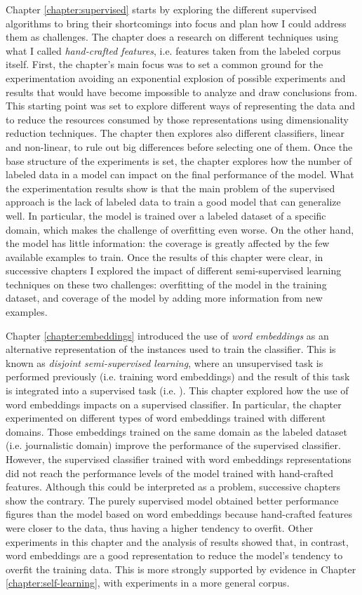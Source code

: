 Chapter \ref{chapter:supervised} starts by exploring the different supervised
algorithms to bring their shortcomings into focus and plan how I could address
them as challenges. The chapter does a research on different techniques using
what I called {\em hand-crafted features}, i.e. features taken from the labeled
corpus itself. First, the chapter's main focus was to set a common ground for
the experimentation avoiding an exponential explosion of possible experiments
and results that would have become impossible to analyze and draw conclusions
from.  This starting point was set to explore different ways of representing
the data and to reduce the resources consumed by those representations using
dimensionality reduction techniques. The chapter then explores also different
classifiers, linear and non-linear, to rule out big differences before
selecting one of them. Once the base structure of the experiments is set, the
chapter explores how the number of labeled data in a model can impact on the
final performance of the model. What the experimentation results show is that
the main problem of the supervised approach is the lack of labeled data to
train a good model that can generalize well. In particular, the model is
trained over a labeled dataset of a specific domain, which makes the challenge
of overfitting even worse. On the other hand, the model has little information:
the coverage is greatly affected by the few available examples to train. Once
the results of this chapter were clear, in successive chapters I explored the
impact of different semi-supervised learning techniques on these two
challenges: overfitting of the model in the training dataset, and coverage of
the model by adding more information from new examples.

Chapter \ref{chapter:embeddings} introduced the use of {\em word embeddings} as
an alternative representation of the instances used to train the classifier.
This is known as {\em disjoint semi-supervised learning}, where an unsupervised
task is performed previously (i.e. training word embeddings) and the result of
this task is integrated into a supervised task (i.e. \vsd). This chapter
explored how the use of word embeddings impacts on a supervised classifier. In
particular, the chapter experimented on different types of word embeddings
trained with different domains. Those embeddings trained on the same domain as
the labeled dataset (i.e. journalistic domain) improve the performance of the
supervised classifier. However, the supervised classifier trained with word
embeddings representations did not reach the performance levels of the model
trained with hand-crafted features. Although this could be interpreted as a
problem, successive chapters show the contrary. The purely supervised model
obtained better performance figures than the model based on word embeddings
because hand-crafted features were closer to the data, thus having a higher
tendency to overfit. Other experiments in this chapter and the analysis of
results showed that, in contrast, word embeddings are a good representation to
reduce the model's tendency to overfit the training data. This is more strongly
supported by evidence in Chapter \ref{chapter:self-learning}, with experiments
in a more general corpus.

